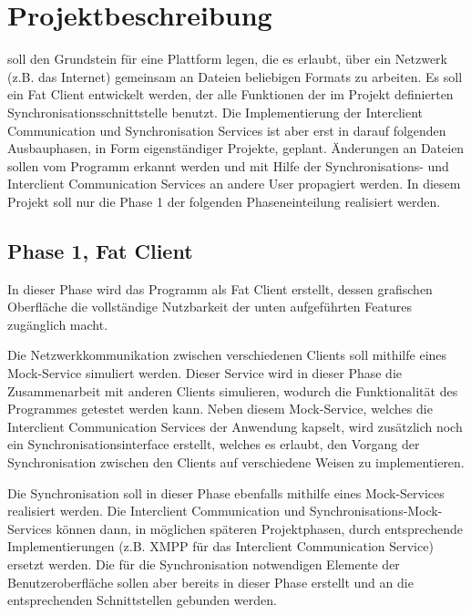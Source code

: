 
\section{Projektbeschreibung}

\sepmprojectname soll den Grundstein für eine Plattform legen, die es erlaubt, über ein Netzwerk (z.B. das Internet) gemeinsam an Dateien beliebigen Formats zu arbeiten. Es soll ein Fat Client entwickelt werden, der alle Funktionen der im Projekt definierten Synchronisationsschnittstelle benutzt. Die Implementierung der Interclient Communication und Synchronisation Services ist aber erst in darauf folgenden Ausbauphasen, in Form eigenständiger Projekte, geplant. Änderungen an Dateien sollen vom Programm erkannt werden und mit Hilfe der Synchronisations- und Interclient Communication Services an andere User propagiert werden. In diesem Projekt soll nur die Phase 1 der folgenden Phaseneinteilung realisiert werden.

\subsection{Phase 1, Fat Client}
In dieser Phase wird das Programm als Fat Client erstellt, dessen grafischen Oberfläche die vollständige Nutzbarkeit der unten aufgeführten Features zugänglich macht.

Die Netzwerkkommunikation zwischen verschiedenen Clients soll mithilfe eines Mock-Service simuliert werden. Dieser Service wird in dieser Phase die Zusammenarbeit mit anderen Clients simulieren, wodurch die Funktionalität des Programmes getestet werden kann. Neben diesem Mock-Service, welches die Interclient Communication Services der Anwendung kapselt, wird zusätzlich noch ein Synchronisationsinterface erstellt, welches es erlaubt, den Vorgang der Synchronisation zwischen den Clients auf verschiedene Weisen zu implementieren.

Die Synchronisation soll in dieser Phase ebenfalls mithilfe eines Mock-Services realisiert werden. Die Interclient Communication und Synchronisations-Mock-Services können dann, in möglichen späteren Projektphasen, durch entsprechende Implementierungen (z.B. XMPP für das Interclient Communication Service) ersetzt werden. Die für die Synchronisation notwendigen Elemente der Benutzeroberfläche sollen aber bereits in dieser Phase erstellt und an die entsprechenden Schnittstellen gebunden werden.


